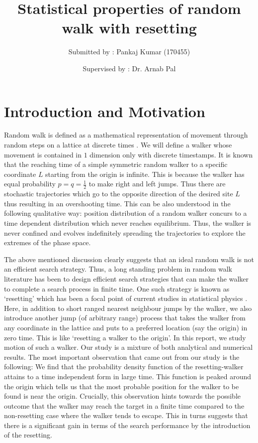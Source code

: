 \documentclass[showpacs,amsmath,amssymb,aps,pre,twocolumn]{revtex4-1}
\begin{document}

\title{Statistical properties of random walk with resetting}


\author{Submitted by : Pankaj Kumar (170455)}
\author{Supervised by : Dr. Arnab Pal}




\maketitle
\section{Introduction and  Motivation}
{
Random walk is defined as a mathematical representation of movement through random steps on a lattice at discrete times \cite{LRW-4}. We will define a walker whose movement is contained in $1$ dimension only with discrete timestamps. It is known that the reaching time of a simple symmetric random walker to a specific coordinate $L$ starting from the origin is infinite. This is because the walker has equal probability $p=q=\frac{1}{2}$ to make right and left jumps. Thus there are stochastic trajectories which go to the opposite direction of the desired site $L$ thus resulting in an overshooting time. This can be also understood in the following qualitative way: position distribution of a random walker concurs to a time dependent distribution which never reaches equilibrium. Thus, the walker is never confined and evolves indefinitely spreading the trajectories to explore the extremes of the phase space. 
}

{The above mentioned discussion clearly suggests that an ideal random walk is not an efficient search strategy. Thus, a long standing problem in random walk literature has been to design efficient search strategies that can make the walker to complete a search process in finite time. One such strategy is known as `resetting' which has been a focal point of current studies in statistical physics \cite{FPUR,RW1}. Here, in addition to short ranged nearest neighbour jumps by the walker, we also introduce another jump (of arbitrary range) process that takes the walker from any coordinate in the lattice and puts to a preferred location (say the origin) in zero time. This is like `resetting a walker to the origin'. In this report, we study motion of such a walker. Our study is a mixture of both analytical and numerical results. The most important observation that came out from our study is the following: We find that the probability density function of the resetting-walker attains to a time independent form in large time. This function is peaked around the origin which tells us that the most probable position for the walker to be found is near the origin. Crucially, this observation hints towards the possible outcome that the walker may reach the target in a finite time compared to the non-resetting case where the walker tends to escape. This in turns suggests that there is a significant gain in terms of the search performance by the introduction of the resetting.}
\end{document}
